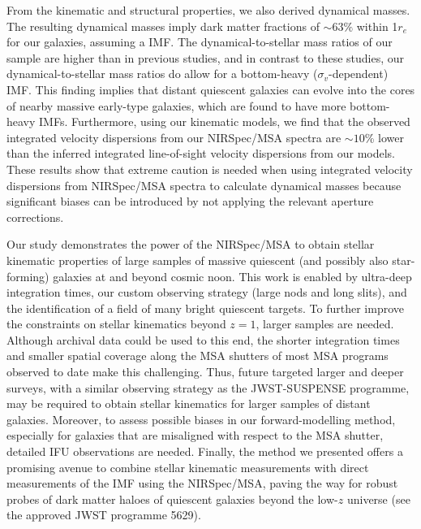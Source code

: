 \documentclass{aa}
\begin{document}
From the kinematic and structural properties, we also derived dynamical masses. The resulting dynamical masses imply dark matter fractions of $\sim63\%$ within 1$r_e$ for our galaxies, assuming a \citet{GChabrier2003} IMF. The dynamical-to-stellar mass ratios of our sample are higher than in previous studies, and in contrast to these studies, our dynamical-to-stellar mass ratios do allow for a bottom-heavy ($\sigma_v$-dependent) IMF. This finding implies that distant quiescent galaxies can evolve into the cores of nearby massive early-type galaxies, which are found to have more bottom-heavy IMFs. Furthermore, using our kinematic models, we find that the observed integrated velocity dispersions from our NIRSpec/MSA spectra are $\sim10$\% lower than the inferred integrated line-of-sight velocity dispersions from our models. These results show that extreme caution is needed when using integrated velocity dispersions from NIRSpec/MSA spectra to calculate dynamical masses because significant biases can be introduced by not applying the relevant aperture corrections.

Our study demonstrates the power of the NIRSpec/MSA to obtain stellar kinematic properties of large samples of massive quiescent (and possibly also star-forming) galaxies at and beyond cosmic noon. This work is enabled by ultra-deep integration times, our custom observing strategy (large nods and long slits), and the identification of a field of many bright quiescent targets. To further improve the constraints on stellar kinematics beyond $z=1$, larger samples are needed. Although archival data could be used to this end, the shorter integration times and smaller spatial coverage along the MSA shutters of most MSA programs observed to date make this challenging. Thus, future targeted larger and deeper surveys, with a similar observing strategy as the JWST-SUSPENSE programme, may be required to obtain stellar kinematics for larger samples of distant galaxies. Moreover, to assess possible biases in our forward-modelling method, especially for galaxies that are misaligned with respect to the MSA shutter, detailed IFU observations are needed. Finally, the method we presented offers a promising avenue to combine stellar kinematic measurements with direct measurements of the IMF using the NIRSpec/MSA, paving the way for robust probes of dark matter haloes of quiescent galaxies beyond the low-$z$ universe (see the approved JWST programme 5629).
\end{document}
